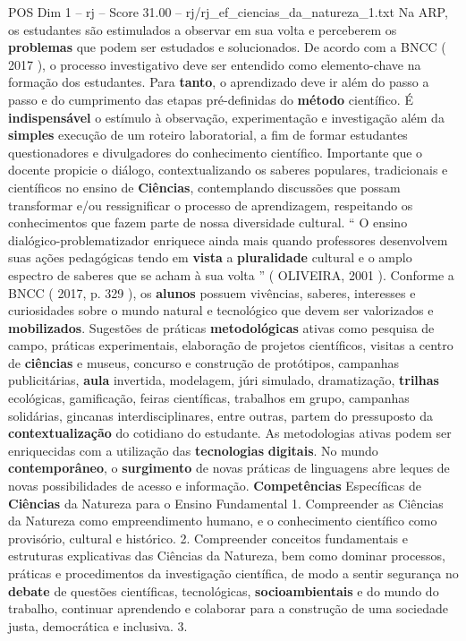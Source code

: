 \begin{textsample}{POS Dim 1 – rj – Score 31.00 – rj/rj\_ef\_ciencias\_da\_natureza\_1.txt}
Na ARP, os estudantes são estimulados a observar em sua volta e perceberem os \textbf{problemas} que podem ser estudados e solucionados.
De acordo com a BNCC ( 2017 ), o processo investigativo deve ser entendido como elemento-chave na formação dos estudantes.
Para \textbf{tanto}, o aprendizado deve ir além do passo a passo e do cumprimento das etapas pré-definidas do \textbf{método} científico.
É \textbf{indispensável} o estímulo à observação, experimentação e investigação além da \textbf{simples} execução de um roteiro laboratorial, a fim de formar estudantes questionadores e divulgadores do conhecimento científico.
Importante que o docente propicie o diálogo, contextualizando os saberes populares, tradicionais e científicos no ensino de \textbf{Ciências}, contemplando discussões que possam transformar e/ou ressignificar o processo de aprendizagem, respeitando os conhecimentos que fazem parte de nossa diversidade cultural. “ O ensino dialógico-problematizador enriquece ainda mais quando professores desenvolvem suas ações pedagógicas tendo em \textbf{vista} a \textbf{pluralidade} cultural e o amplo espectro de saberes que se acham à sua volta ” ( OLIVEIRA, 2001 ).
Conforme a BNCC ( 2017, p. 329 ), os \textbf{alunos} possuem vivências, saberes, interesses e curiosidades sobre o mundo natural e tecnológico que devem ser valorizados e \textbf{mobilizados}.
Sugestões de práticas \textbf{metodológicas} ativas como pesquisa de campo, práticas experimentais, elaboração de projetos científicos, visitas a centro de \textbf{ciências} e museus, concurso e construção de protótipos, campanhas publicitárias, \textbf{aula} invertida, modelagem, júri simulado, dramatização, \textbf{trilhas} ecológicas, gamificação, feiras científicas, trabalhos em grupo, campanhas solidárias, gincanas interdisciplinares, entre outras, partem do pressuposto da \textbf{contextualização} do cotidiano do estudante.
As metodologias ativas podem ser enriquecidas com a utilização das \textbf{tecnologias} \textbf{digitais}.
No mundo \textbf{contemporâneo}, o \textbf{surgimento} de novas práticas de linguagens abre leques de novas possibilidades de acesso e informação. \textbf{Competências} Específicas de \textbf{Ciências} da Natureza para o Ensino Fundamental 1.
Compreender as Ciências da Natureza como empreendimento humano, e o conhecimento científico como provisório, cultural e histórico. 2.
Compreender conceitos fundamentais e estruturas explicativas das Ciências da Natureza, bem como dominar processos, práticas e procedimentos da investigação científica, de modo a sentir segurança no \textbf{debate} de questões científicas, tecnológicas, \textbf{socioambientais} e do mundo do trabalho, continuar aprendendo e colaborar para a construção de uma sociedade justa, democrática e inclusiva. 3.

\end{textsample}
